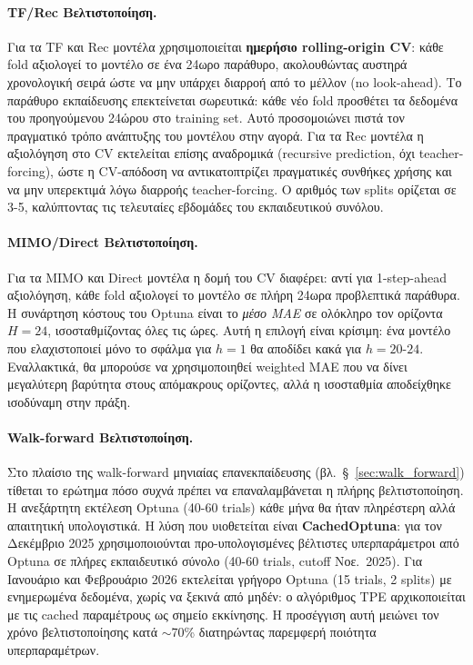 \paragraph{TF/Rec Βελτιστοποίηση.}
Για τα TF και Rec μοντέλα χρησιμοποιείται \textbf{ημερήσιο rolling-origin CV}: κάθε fold
αξιολογεί το μοντέλο σε ένα 24ωρο παράθυρο, ακολουθώντας αυστηρά χρονολογική σειρά
ώστε να μην υπάρχει διαρροή από το μέλλον (no look-ahead). Το παράθυρο εκπαίδευσης
επεκτείνεται σωρευτικά: κάθε νέο fold προσθέτει τα δεδομένα του προηγούμενου 24ώρου
στο training set. Αυτό προσομοιώνει πιστά τον πραγματικό τρόπο ανάπτυξης του μοντέλου
στην αγορά. Για τα Rec μοντέλα η αξιολόγηση στο CV εκτελείται επίσης αναδρομικά
(recursive prediction, όχι teacher-forcing), ώστε η CV-απόδοση να αντικατοπτρίζει
πραγματικές συνθήκες χρήσης και να μην υπερεκτιμά λόγω διαρροής teacher-forcing.
Ο αριθμός των splits ορίζεται σε 3-5, καλύπτοντας τις τελευταίες εβδομάδες του
εκπαιδευτικού συνόλου.

\paragraph{MIMO/Direct Βελτιστοποίηση.}
Για τα MIMO και Direct μοντέλα η δομή του CV διαφέρει: αντί για 1-step-ahead αξιολόγηση,
κάθε fold αξιολογεί το μοντέλο σε πλήρη 24ωρα προβλεπτικά παράθυρα. Η συνάρτηση κόστους
του Optuna είναι το \textit{μέσο MAE} σε ολόκληρο τον ορίζοντα $H = 24$, ισοσταθμίζοντας
όλες τις ώρες. Αυτή η επιλογή είναι κρίσιμη: ένα μοντέλο που ελαχιστοποιεί μόνο το
σφάλμα για $h=1$ θα αποδίδει κακά για $h=20$-$24$. Εναλλακτικά, θα μπορούσε να
χρησιμοποιηθεί weighted MAE που να δίνει μεγαλύτερη βαρύτητα στους απόμακρους ορίζοντες,
αλλά η ισοσταθμία αποδείχθηκε ισοδύναμη στην πράξη.

\paragraph{Walk-forward Βελτιστοποίηση.}
Στο πλαίσιο της walk-forward μηνιαίας επανεκπαίδευσης (βλ.\ §~\ref{sec:walk_forward})
τίθεται το ερώτημα πόσο συχνά πρέπει να επαναλαμβάνεται η πλήρης βελτιστοποίηση. Η
ανεξάρτητη εκτέλεση Optuna (40-60 trials) κάθε μήνα θα ήταν πληρέστερη αλλά απαιτητική
υπολογιστικά. Η λύση που υιοθετείται είναι \textbf{CachedOptuna}: για τον Δεκέμβριο 2025
χρησιμοποιούνται προ-υπολογισμένες βέλτιστες υπερπαράμετροι από Optuna σε πλήρες
εκπαιδευτικό σύνολο (40-60 trials, cutoff Νοε.~2025). Για Ιανουάριο και Φεβρουάριο
2026 εκτελείται γρήγορο Optuna (15 trials, 2 splits) με ενημερωμένα δεδομένα, χωρίς
να ξεκινά από μηδέν: ο αλγόριθμος TPE αρχικοποιείται με τις cached παραμέτρους ως
σημείο εκκίνησης. Η προσέγγιση αυτή μειώνει τον χρόνο βελτιστοποίησης κατά $\sim$70\%
διατηρώντας παρεμφερή ποιότητα υπερπαραμέτρων.


